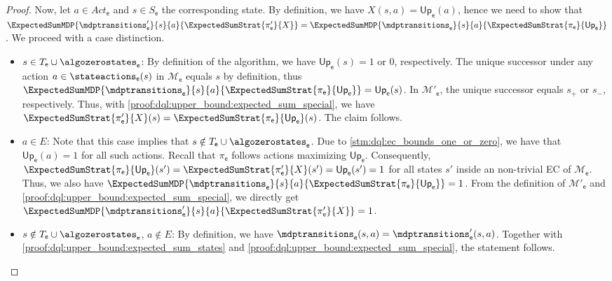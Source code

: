 \documentclass{theoretics}
\newcommand{\unionSym}{\cup}
\newcommand{\unionBin}{\mathbin{\unionSym}}
\newcommand{\union}{\unionBin}
\newcommand{\MDP}{\mathcal{M}}
\newcommand{\States}{S}
\newcommand{\Actions}{Act}
\newcommand{\strategy}{\pi}
\newcommand{\upperbound}{\mathsf{Up}}
\newcommand{\targetstate}{s_+}
\newcommand{\sinkstate}{s_-}
\newcommand{\targetset}{T}
\newcommand{\algoepisode}{\mathsf{e}}
\begin{document}
\begin{proof}
	Now, let $a \in \Actions_\algoepisode$ and $s \in \States_\algoepisode$ the corresponding state.
	By definition, we have $X(s, a) = \upperbound_{\algoepisode}(a)$, hence we need to show that $\ExpectedSumMDP{\mdptransitions_\algoepisode'}{s}{a}{\ExpectedSumStrat{\strategy'_\algoepisode}{X}} = \ExpectedSumMDP{\mdptransitions_\algoepisode}{s}{a}{\ExpectedSumStrat{\strategy_\algoepisode}{\upperbound_{\algoepisode}}}$.
	We proceed with a case distinction.
	\begin{itemize}
		\item
		$s \in \targetset_\algoepisode \union \algozerostates_\algoepisode$: By definition of the algorithm, we have $\upperbound_\algoepisode(s) = 1$ or $0$, respectively.
		The unique successor under any action $a \in \stateactions_\algoepisode(s)$ in $\MDP_\algoepisode$ equals $s$ by definition, thus $\ExpectedSumMDP{\mdptransitions_\algoepisode}{s}{a}{\ExpectedSumStrat{\strategy_\algoepisode}{\upperbound_{\algoepisode}}} = \upperbound_\algoepisode(s)$.
		In $\MDP'_\algoepisode$, the unique successor equals $\targetstate$ or $\sinkstate$, respectively.
		Thus, with \ref{proof:dql:upper_bound:expected_sum_special}, we have $\ExpectedSumStrat{\strategy'_\algoepisode}{X}(s) = \ExpectedSumStrat{\strategy_\algoepisode}{\upperbound_{\algoepisode}}(s)$.
		The claim follows.

		\item
		$a \in E$: Note that this case implies that $s \notin \targetset_\algoepisode \union \algozerostates_\algoepisode$.
		Due to \cref{stm:dql:ec_bounds_one_or_zero}, we have that $\upperbound_\algoepisode(a) = 1$ for all such actions.
		Recall that $\strategy_\algoepisode$ follows actions maximizing $\upperbound_\algoepisode$.
		Consequently, $\ExpectedSumStrat{\strategy_\algoepisode}{\upperbound_{\algoepisode}}(s') = \ExpectedSumStrat{\strategy'_\algoepisode}{X}(s') = \upperbound_{\algoepisode}(s') = 1$ for all states $s'$ inside an non-trivial EC of $\MDP_\algoepisode$.
		Thus, we also have $\ExpectedSumMDP{\mdptransitions_\algoepisode}{s}{a}{\ExpectedSumStrat{\strategy_\algoepisode}{\upperbound_{\algoepisode}}} = 1$.
		From the definition of $\MDP'_\algoepisode$ and \ref{proof:dql:upper_bound:expected_sum_special}, we directly get $\ExpectedSumMDP{\mdptransitions_\algoepisode'}{s}{a}{\ExpectedSumStrat{\strategy'_\algoepisode}{X}} = 1$.

		\item
		$s \notin \targetset_\algoepisode \union \algozerostates_\algoepisode$, $a \notin E$: By definition, we have $\mdptransitions_\algoepisode(s, a) = \mdptransitions_\algoepisode'(s, a)$.
		Together with \ref{proof:dql:upper_bound:expected_sum_states} and \ref{proof:dql:upper_bound:expected_sum_special}, the statement follows.
	\end{itemize}


\end{proof}
\end{document}
